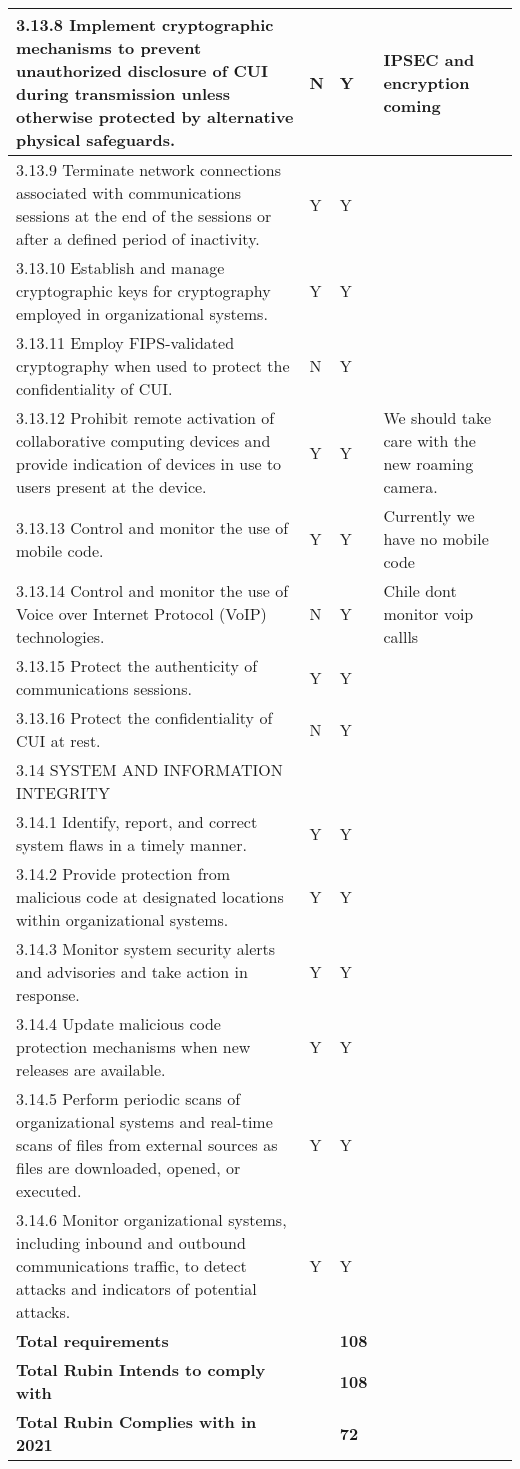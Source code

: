 \begin{longtable} {|p{}|p{}|p{}|p{} |}
{3.13.8 Implement cryptographic mechanisms to prevent unauthorized disclosure of CUI during transmission unless otherwise protected by alternative physical safeguards.}&{N}&{Y}&{IPSEC and encryption coming} \\ \hline
{3.13.9 Terminate network connections associated with communications sessions at the end of the sessions or after a defined period of inactivity.}&{Y}&{Y}& \\ \hline
{3.13.10 Establish and manage cryptographic keys for cryptography employed in organizational systems.}&{Y}&{Y}& \\ \hline
{3.13.11 Employ FIPS-validated cryptography when used to protect the confidentiality of CUI.}&{N}&{Y}& \\ \hline
{3.13.12 Prohibit remote activation of collaborative computing devices and provide indication of devices in use to users present at the device.}&{Y}&{Y}&{We should take care with the new roaming camera.} \\ \hline
{3.13.13 Control and monitor the use of mobile code.}&{Y}&{Y}&{Currently we have no mobile code} \\ \hline
{3.13.14 Control and monitor the use of Voice over Internet Protocol (VoIP) technologies.}&{N}&{Y}&{Chile dont monitor voip callls} \\ \hline
{3.13.15 Protect the authenticity of communications sessions.}&{Y}&{Y}& \\ \hline
{3.13.16 Protect the confidentiality of CUI at rest.}&{N}&{Y}& \\ \hline
{3.14 SYSTEM AND INFORMATION INTEGRITY}&&& \\ \hline
{3.14.1 Identify, report, and correct system flaws in a timely manner.}&{Y}&{Y}& \\ \hline
{3.14.2 Provide protection from malicious code at designated locations within organizational systems.}&{Y}&{Y}& \\ \hline
{3.14.3 Monitor system security alerts and advisories and take action in response.}&{Y}&{Y}& \\ \hline
{3.14.4 Update malicious code protection mechanisms when new releases are available.}&{Y}&{Y}& \\ \hline
{3.14.5 Perform periodic scans of organizational systems and real-time scans of files from external sources as files are downloaded, opened, or executed.}&{Y}&{Y}& \\ \hline
{3.14.6 Monitor organizational systems, including inbound and outbound communications traffic, to detect attacks and indicators of potential attacks.}&{Y}&{Y}& \\ \hline
\textbf{Total requirements}&\textbf{}&\textbf{108}& \\ \hline
\textbf{Total Rubin Intends to comply with }&\textbf{}&\textbf{108}& \\ \hline
\textbf{Total Rubin Complies with in 2021}&\textbf{}&\textbf{72}& \\ \hline
\end{longtable} \normalsize
